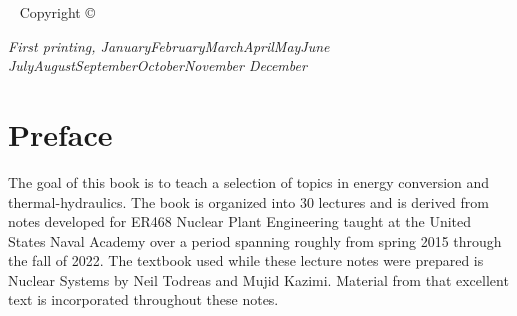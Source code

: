 \documentclass{tufte-book}
\newcommand{\monthyear}{%
  \ifcase\month\or January\or February\or March\or April\or May\or June\or
  July\or August\or September\or October\or November\or
  December\fi\space\number\year
}
\begin{document}
\maketitle


\newpage
\begin{fullwidth}
~\vfill
\thispagestyle{empty}
\setlength{\parindent}{0pt}
\setlength{\parskip}{\baselineskip}
Copyright \copyright\ \the\year\ \thanklessauthor
\par{}

%

\par\textit{First printing, \monthyear}
\end{fullwidth}

\tableofcontents

\listoffigures

\listoftables



\cleardoublepage
\chapter*{Preface}

The goal of this book is to teach a selection of topics in energy conversion and thermal-hydraulics.  The book is organized into 30 lectures and is derived from notes developed for ER468 Nuclear Plant Engineering taught at the United States Naval Academy over a period spanning roughly from spring 2015 through the fall of 2022.  The textbook used while these lecture notes were prepared is Nuclear Systems by Neil Todreas and Mujid Kazimi.\cite{todreasNS}  Material from that excellent text is incorporated throughout these notes.
\end{document}
